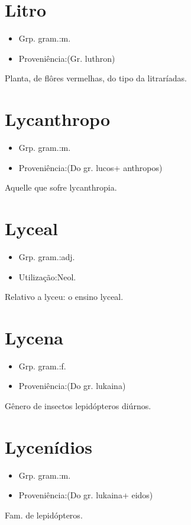 \section{Litro}
\begin{itemize}
\item {Grp. gram.:m.}
\end{itemize}
\begin{itemize}
\item {Proveniência:(Gr. \textunderscore luthron\textunderscore )}
\end{itemize}
Planta, de flôres vermelhas, do tipo da litraríadas.
\section{Lycanthropo}
\begin{itemize}
\item {Grp. gram.:m.}
\end{itemize}
\begin{itemize}
\item {Proveniência:(Do gr. \textunderscore lucos\textunderscore  + \textunderscore anthropos\textunderscore )}
\end{itemize}
Aquelle que sofre lycanthropia.
\section{Lyceal}
\begin{itemize}
\item {Grp. gram.:adj.}
\end{itemize}
\begin{itemize}
\item {Utilização:Neol.}
\end{itemize}
Relativo a lyceu: \textunderscore o ensino lyceal\textunderscore .
\section{Lycena}
\begin{itemize}
\item {Grp. gram.:f.}
\end{itemize}
\begin{itemize}
\item {Proveniência:(Do gr. \textunderscore lukaina\textunderscore )}
\end{itemize}
Gênero de insectos lepidópteros diúrnos.
\section{Lycenídios}
\begin{itemize}
\item {Grp. gram.:m.}
\end{itemize}
\begin{itemize}
\item {Proveniência:(Do gr. \textunderscore lukaina\textunderscore  + \textunderscore eidos\textunderscore )}
\end{itemize}
Fam. de lepidópteros.
